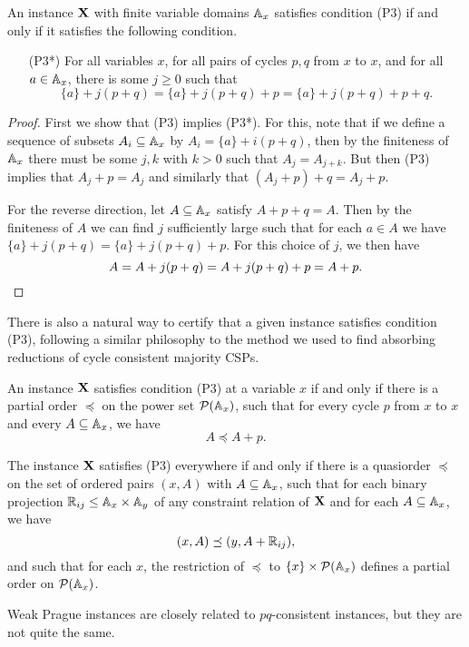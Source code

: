 \documentclass[letterpaper,11pt]{article}
\begin{document}
\begin{prop} An instance $\mathbf{X}$ with finite variable domains $\mathbb{A}_x$ satisfies condition (P3) if and only if it satisfies the following condition.
\begin{itemize}
\item[(P3*)] For all variables $x$, for all pairs of cycles $p,q$ from $x$ to $x$, and for all $a \in \mathbb{A}_x$, there is some $j \ge 0$ such that
\[
\{a\} + j(p+q) = \{a\} + j(p+q) + p = \{a\} + j(p+q) + p + q.
\]
\end{itemize}
\end{prop}
\begin{proof} First we show that (P3) implies (P3*). For this, note that if we define a sequence of subsets $A_i \subseteq \mathbb{A}_x$ by $A_i = \{a\} + i(p+q)$, then by the finiteness of $\mathbb{A}_x$ there must be some $j,k$ with $k > 0$ such that $A_j = A_{j+k}$. But then (P3) implies that $A_j + p = A_j$ and similarly that $(A_j + p) + q = A_j + p$.

For the reverse direction, let $A \subseteq \mathbb{A}_x$ satisfy $A+p+q = A$. Then by the finiteness of $A$ we can find $j$ sufficiently large such that for each $a \in A$ we have $\{a\} + j(p+q) = \{a\} + j(p+q) + p$. For this choice of $j$, we then have
\[
A = A + j(p+q) = A + j(p+q) + p = A + p.\qedhere
\]
\end{proof}

There is also a natural way to certify that a given instance satisfies condition (P3), following a similar philosophy to the method we used to find absorbing reductions of cycle consistent majority CSPs.

\begin{prop} An instance $\mathbf{X}$ satisfies condition (P3) at a variable $x$ if and only if there is a partial order $\preceq$ on the power set $\mathcal{P}(\mathbb{A}_x)$, such that for every cycle $p$ from $x$ to $x$ and every $A \subseteq \mathbb{A}_x$, we have
\[
A \preceq A+p.
\]

The instance $\mathbf{X}$ satisfies (P3) everywhere if and only if there is a quasiorder $\preceq$ on the set of ordered pairs $(x,A)$ with $A \subseteq \mathbb{A}_x$, such that for each binary projection $\mathbb{R}_{ij} \le \mathbb{A}_x \times \mathbb{A}_y$ of any constraint relation of $\mathbf{X}$ and for each $A \subseteq \mathbb{A}_x$, we have
\[
(x,A) \preceq (y,A+\mathbb{R}_{ij}),
\]
and such that for each $x$, the restriction of $\preceq$ to $\{x\}\times \mathcal{P}(\mathbb{A}_x)$ defines a partial order on $\mathcal{P}(\mathbb{A}_x)$.
\end{prop}

Weak Prague instances are closely related to $pq$-consistent instances, but they are not quite the same.
\end{document}
